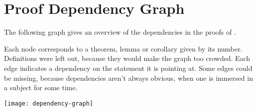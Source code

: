 \appendix
\section{Proof Dependency Graph}\label{sec:dependency-graph}

The following graph gives an overview of the dependencies in the proofs of \cite{shitov2020sublinear}.

Each node corresponds to a theorem, lemma or corollary given by its number. Definitions were left out, because they would make the graph too crowded. Each edge indicates a dependency on the statement it is pointing at. Some edges could be missing, because dependencies aren't always obvious, when one is immersed in a subject for some time.

\texttt{[image: dependency-graph]}

\newpage